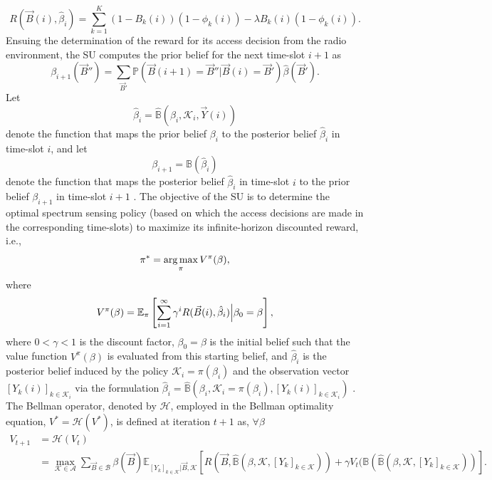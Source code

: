 \begin{equation}\label{12}
    R(\vec{B}(i),\hat{\beta}_{i})=\sum_{k=1}^{K}(1-B_{k}(i))(1-\phi_{k}(i))-\lambda B_{k}(i)(1-\phi_{k}(i)).
\end{equation}
Ensuing the determination of the reward for its access decision from the radio environment, the SU computes the prior belief for the next time-slot $i+1$ as
\begin{equation}\label{13}
    \beta_{i+1}(\vec{B}'')=\sum_{\vec{B}'}\mathbb{P}(\vec{B}(i+1)=\vec{B}''|\vec{B}(i)=\vec{B}')\hat{\beta}(\vec{B}').
\end{equation}
Let
\begin{equation}\label{14}
    \hat{\beta}_{i}=\hat{\mathbb{B}}(\beta_{i},\mathcal{K}_{i},\vec{Y}(i))
\end{equation}
denote the function that maps the prior belief $\beta_{i}$ to the posterior belief $\hat{\beta}_{i}$ in time-slot $i$, and let
\begin{equation}\label{15}
    \beta_{i+1}=\mathbb{B}(\hat{\beta}_{i})
\end{equation}
denote the function that maps the posterior belief $\hat{\beta}_{i}$ in time-slot $i$ to the prior belief $\beta_{i+1}$ in time-slot $i+1$ \cite{WCL:paper}. The objective of the SU is to determine the optimal spectrum sensing policy (based on which the access decisions are made in the corresponding time-slots) to maximize its infinite-horizon discounted reward, i.e.,
\begin{equation}\label{16}
    \pi^{*}=\operatorname*{arg\,max}_{\pi}V^{\pi}(\beta),
\end{equation}
where
\begin{equation}\label{17}
    V^{\pi}(\beta)=\mathbb{E}_{\pi}\left[\sum_{i=1}^{\infty}\gamma^{i}R(\vec{B}(i),\hat{\beta}_{i})\Big{|}\beta_{0}=\beta\right],
\end{equation}
where $0{<}\gamma{<}1$ is the discount factor, $\beta_{0}{=}\beta$ is the initial belief such that the value function $V^{\pi}(\beta)$ is evaluated from this starting belief, and $\hat{\beta}_{i}$ is the posterior belief induced by the policy $\mathcal{K}_{i}{=}\pi(\beta_{i})$ and the observation vector $[Y_{k}(i)]_{k{\in}\mathcal{K}_{i}}$ via the formulation $\hat{\beta}_{i}{=}\hat{\mathbb{B}}(\beta_{i},\mathcal{K}_{i}{=}\pi(\beta_{i}),[Y_{k}(i)]_{k{\in}\mathcal{K}_{i}})$ \cite{WCL:paper}. The Bellman operator, denoted by $\mathcal{H}$, employed in the Bellman optimality equation, $V^{*}{=}\mathcal{H}(V^{*})$, is defined at iteration $t+1$ as, $\forall{\beta}$
\begin{equation}\label{18}
    \begin{aligned}
        V_{t+1}&=\mathcal{H}(V_{t})\\
        &=\max_{\mathcal{K} \in \mathcal{A}}\sum_{\vec{B} \in \mathcal{B}}\beta(\vec{B})\mathbb{E}_{[Y_{k}]_{k \in \mathcal{K}}|\vec{B},\mathcal{K}}\left[R(\vec{B},\hat{\mathbb{B}}(\beta,\mathcal{K},[Y_{k}]_{k \in \mathcal{K}}))+\gamma V_{t}(\mathbb{B}(\hat{\mathbb{B}}(\beta,\mathcal{K},[Y_{k}]_{k \in \mathcal{K}}))\right].
    \end{aligned}
\end{equation}
